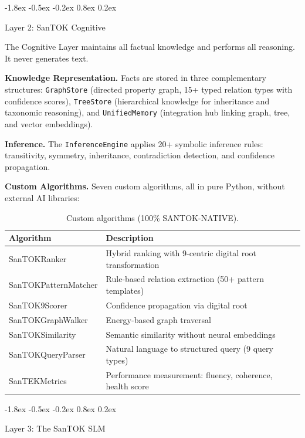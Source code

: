 \documentclass[10pt]{article}
\makeatletter
\renewcommand{\subsection}{\@startsection{subsection}{2}{\z@}%
  {-1.8ex \@plus -0.5ex \@minus -0.2ex}%
  {0.8ex \@plus 0.2ex}%
  {\normalsize\bfseries\raggedright}}
\makeatother
\begin{document}
\subsection{Layer 2: SanTOK Cognitive}

The Cognitive Layer maintains all factual knowledge and performs all reasoning.
It never generates text.

\textbf{Knowledge Representation.}
Facts are stored in three complementary structures: \texttt{GraphStore} (directed
property graph, 15+ typed relation types with confidence scores),
\texttt{TreeStore} (hierarchical knowledge for inheritance and taxonomic reasoning),
and \texttt{UnifiedMemory} (integration hub linking graph, tree, and vector
embeddings).

\textbf{Inference.}
The \texttt{InferenceEngine} applies 20+ symbolic inference rules: transitivity,
symmetry, inheritance, contradiction detection, and confidence propagation.

\textbf{Custom Algorithms.}
Seven custom algorithms, all in pure Python, without external AI libraries:

\begin{table}[t]
\centering
\caption{Custom algorithms (100\% SANTOK-NATIVE).}
\label{tab:algorithms}
\begin{tabular}{ll}
\toprule
\textbf{Algorithm} & \textbf{Description} \\
\midrule
SanTOKRanker & Hybrid ranking with 9-centric digital root transformation \\
SanTOKPatternMatcher & Rule-based relation extraction (50+ pattern templates) \\
SanTOK9Scorer & Confidence propagation via digital root \\
SanTOKGraphWalker & Energy-based graph traversal \\
SanTOKSimilarity & Semantic similarity without neural embeddings \\
SanTOKQueryParser & Natural language to structured query (9 query types) \\
SanTEKMetrics & Performance measurement: fluency, coherence, health score \\
\bottomrule
\end{tabular}
\end{table}

\subsection{Layer 3: The SanTOK SLM}
\end{document}
